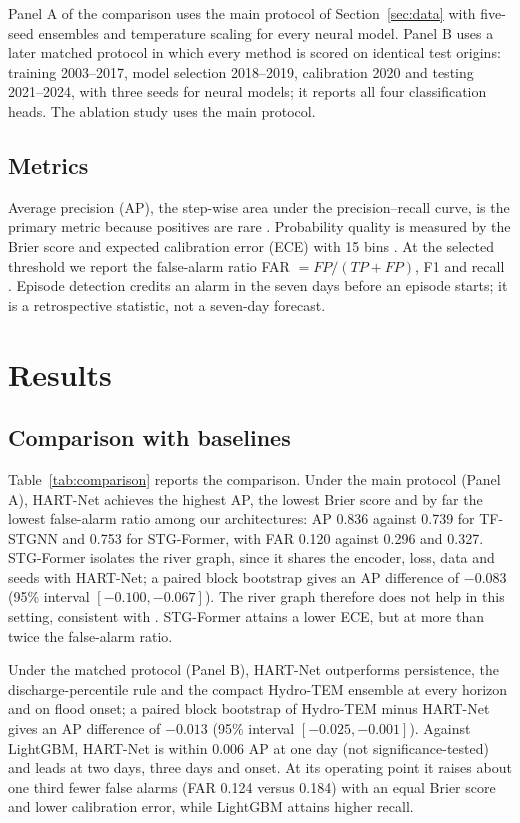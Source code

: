 \documentclass[conference]{IEEEtran}
\newcommand{\model}{HART-Net}
\begin{document}
Panel A of the comparison uses the main protocol of Section~\ref{sec:data}
with five-seed ensembles and temperature scaling for every neural model. Panel B
uses a later matched protocol in which every method is scored on identical test
origins: training 2003--2017, model selection 2018--2019, calibration 2020 and
testing 2021--2024, with three seeds for neural models; it reports all four
classification heads. The ablation study uses the main protocol.

\subsection{Metrics}
Average precision (AP), the step-wise area under the precision--recall curve,
is the primary metric because positives are rare \cite{saito2015}. Probability
quality is measured by the Brier score \cite{brier1950} and expected calibration
error (ECE) with 15 bins \cite{naeini2015,guo2017}. At the selected threshold we
report the false-alarm ratio FAR $=FP/(TP+FP)$, F1 and recall
\cite{jolliffe2012}. Episode detection credits an alarm in the seven days before
an episode starts; it is a retrospective statistic, not a seven-day forecast.

\section{Results}
\subsection{Comparison with baselines}
Table~\ref{tab:comparison} reports the comparison. Under the main protocol
(Panel A), \model{} achieves the highest AP, the lowest Brier score and by far
the lowest false-alarm ratio among our architectures: AP 0.836 against 0.739 for
TF-STGNN and 0.753 for STG-Former, with FAR 0.120 against 0.296 and 0.327.
STG-Former isolates the river graph, since it shares the encoder, loss, data and
seeds with \model{}; a paired block bootstrap gives an AP difference of $-0.083$
(95\% interval $[-0.100,-0.067]$). The river graph therefore does not help in
this setting, consistent with \cite{kirschstein2024}. STG-Former attains a
lower ECE, but at more than twice the false-alarm ratio.

Under the matched protocol (Panel B), \model{} outperforms persistence, the
discharge-percentile rule and the compact Hydro-TEM ensemble at every horizon
and on flood onset; a paired block bootstrap of Hydro-TEM minus \model{} gives
an AP difference of $-0.013$ (95\% interval $[-0.025,-0.001]$). Against
LightGBM, \model{} is within 0.006 AP at one day (not significance-tested) and
leads at two days, three days and onset. At its operating point it raises about
one third fewer false alarms (FAR 0.124 versus 0.184) with an equal Brier score
and lower calibration error, while LightGBM attains higher recall.
\end{document}
